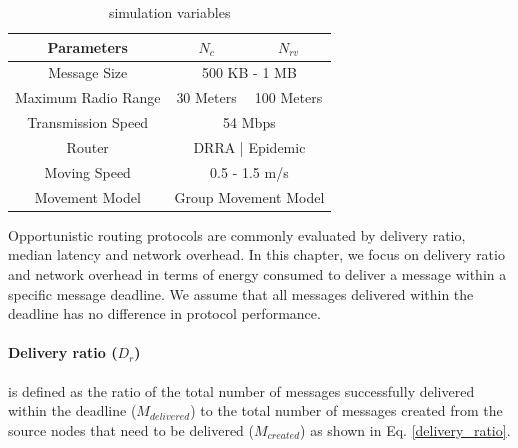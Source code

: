 \begin{table}[!t]
	\renewcommand{\arraystretch}{1.3}
	\caption{simulation variables}
	\label{table_parameters}
	\centering
	\begin{tabular}{|c|c|c|}
		\hline
		Parameters         &  $N_{c}$ & $N_{rv}$ \\ \hline
		Message Size       &  \multicolumn{2}{|c|}{500 KB - 1 MB}        \\ \hline
		Maximum Radio Range & 30 Meters  & 100 Meters \\ \hline
		Transmission Speed &  \multicolumn{2}{|c|}{ 54 Mbps   }        \\ \hline
		Router             & \multicolumn{2}{|c|}{ DRRA | Epidemic   } \\ \hline
		Moving Speed       &   \multicolumn{2}{|c|}{0.5 - 1.5 m/s }        \\ \hline
		Movement Model     &   \multicolumn{2}{|c|}{Group Movement Model  }      \\ \hline
	\end{tabular}
\end{table}

Opportunistic routing protocols are commonly evaluated by delivery ratio, median latency and network overhead.
In this chapter, we focus on delivery ratio and network overhead in terms of energy consumed to deliver a message within a specific message deadline.
We assume that all messages delivered within the deadline has no difference in protocol performance.


\paragraph{Delivery ratio ($D_{r}$)} 
is defined as the ratio of the total number of messages successfully delivered within the deadline ($ { M }_{ delivered }$) to the total number of messages created from the source nodes that need to be delivered ($ { M }_{ created }$) as shown in Eq. \ref{delivery_ratio}.

